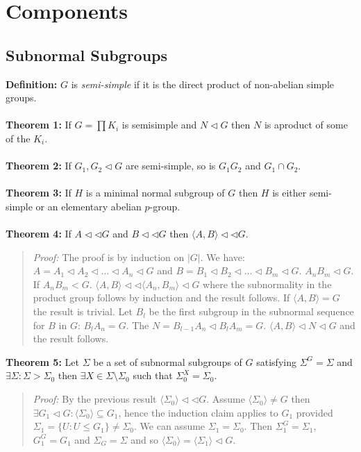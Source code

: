 \chapter{Components}
\section{Subnormal Subgroups}
{\bf Definition:} $G$ is \emph{semi-simple} if it is the direct product of non-abelian simple groups.
\\
\\
{\bf Theorem 1:} If $G= \prod K_i$ is semisimple and $N \lhd G$ then $N$ is  aproduct of some of the $K_i$.
\\
\\
{\bf Theorem 2:} If $G_1 , G_2 \lhd G$ are semi-simple, so is $G_1 G_2$ and $G_1 \cap G_2$.
\\
\\
{\bf Theorem 3:} If  $H$ is a minimal normal subgroup of $G$ then $H$ is either semi-simple or an elementary abelian
$p$-group.
\\
\\
{\bf Theorem 4:} If
$A \lhd \lhd G$ and $B \lhd \lhd G$ then $ \langle A, B \rangle \lhd \lhd G$.
\begin{quote}
\emph{Proof:}  The proof is by induction on $|G|$.  We have:
$A=A_1 \lhd A_2 \lhd \ldots \lhd A_n \lhd G$
and
$B=B_1 \lhd B_2 \lhd \ldots \lhd B_m \lhd G$.  $A_n B_m \lhd G$.  If
$A_n B_m < G$.  $ \langle A, B \rangle \lhd \lhd \langle A_n , B_m \rangle \lhd G$
where the subnormality in the product group follows by induction and the result follows.
If $ \langle A, B \rangle = G$ the result is trivial.  Let $B_l$ be the first subgroup in the subnormal
sequence for $B$ in $G$: $B_lA_n=G$.  The $N=B_{l-1}A_n \lhd B_l A_m =G$.
$ \langle A,B \rangle \lhd N \lhd G$ and the result follows.
\end{quote}
{\bf Theorem 5:}
Let $\Sigma$ be a set of subnormal subgroups of $G$ satisfying
$\Sigma^G=\Sigma$ and $\exists \Sigma: \Sigma > \Sigma_0$ then
$\exists X \in \Sigma \setminus \Sigma_0$ such that $\Sigma_0^X=\Sigma_0$.
\begin{quote}
\emph{Proof:}
By the previous result $ \langle \Sigma_0 \rangle \lhd \lhd G$.  Assume $ \langle \Sigma_0 \rangle \ne G$ then $\exists G_1 \lhd G: \langle \Sigma_0 \rangle \subseteq G_1$, hence the induction claim applies to
$G_1$ provided $\Sigma_1 = \{ U: U \le G_1 \} \ne \Sigma_0$.  We can assume
$\Sigma_1= \Sigma_0$.  Then $\Sigma_1^G = \Sigma_1$, $G_1^G = G_1$ and $\Sigma_G = \Sigma$ and
so $ \langle \Sigma_0 \rangle = \langle \Sigma_1 \rangle \lhd G$.
\end{quote}
